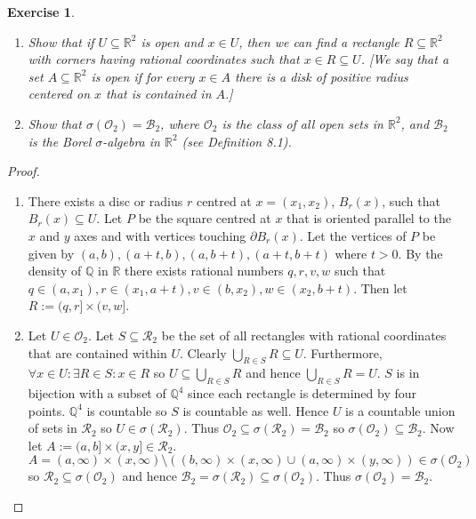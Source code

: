 \documentclass{article}
\newtheorem{exercise}[theorem]{Exercise}
\begin{document}
\begin{exercise} 
    \begin{enumerate}
        \item[(a)] Show that if $U \subseteq \mathbb{R}^2$ is open and $x \in U$, then we can find a rectangle $R \subseteq \mathbb{R}^2$ with corners having rational coordinates such that $x \in R \subseteq U$. 
        \textit{[We say that a set $A \subseteq \mathbb{R}^2$ is open if for every $x \in A$ there is a disk of positive radius centered on $x$ that is contained in $A$.]}
        \item[(b)] Show that $\sigma(\mathcal{O}_2) = \mathcal{B}_2$, where $\mathcal{O}_2$ is the class of all open sets in $\mathbb{R}^2$, and $\mathcal{B}_2$ is the Borel $\sigma$-algebra in $\mathbb{R}^2$ (see Definition 8.1).
    \end{enumerate}
\end{exercise}
\begin{proof}
\begin{enumerate}
    \item[(a)] There exists a disc or radius $r$ centred at $x=(x_1,x_2)$, $B_r(x)$, such that $B_r(x)\subseteq U$. Let $P$ be the square centred at $x$ that is oriented parallel to the $x$ and $y$ axes and with vertices touching $\partial B_r(x)$. Let the vertices of $P$ be given by $(a,b),(a+t,b),(a,b+t),(a+t,b+t)$ where $t>0$. By the density of $\mathbb{Q}$ in $\mathbb{R}$ there exists rational numbers $q,r,v,w$ such that $q\in(a,x_1),r\in(x_1,a+t),v\in(b,x_2),w\in(x_2,b+t)$. Then let $R:=(q,r]\times(v,w]$.
    \item[(b)] Let $U\in\mathcal{O}_2$. Let $S\subseteq\mathcal{R}_2$ be the set of all rectangles with rational coordinates that are contained within $U$. Clearly $\bigcup_{R\in S}R\subseteq U$. Furthermore, $\forall x\in U:\exists R\in S:x\in R$ so $U\subseteq\bigcup_{R\in S}R$ and hence $\bigcup_{R\in S}R=U$. $S$ is in bijection with a subset of $\mathbb{Q}^4$ since each rectangle is determined by four points. $\mathbb{Q}^4$ is countable so $S$ is countable as well. Hence $U$ is a countable union of sets in $\mathcal{R}_2$ so $U\in\sigma(\mathcal{R}_2)$. Thus $\mathcal{O}_2\subseteq\sigma(\mathcal{R}_2)=\mathcal{B}_2$ so $\sigma(\mathcal{O}_2)\subseteq\mathcal{B}_2$. Now let $A:=(a,b]\times(x,y]\in\mathcal{R}_2$. $A=(a,\infty)\times(x,\infty)\setminus((b,\infty)\times(x,\infty)\cup(a, \infty)\times(y,\infty))\in\sigma(\mathcal{O}_2)$ so $\mathcal{R}_2\subseteq\sigma(\mathcal{O}_2)$ and hence $\mathcal{B}_2=\sigma(\mathcal{R}_2)\subseteq\sigma(\mathcal{O}_2)$. Thus $\sigma(\mathcal{O}_2)=\mathcal{B}_2$.
\end{enumerate}
\end{proof}
\end{document}
